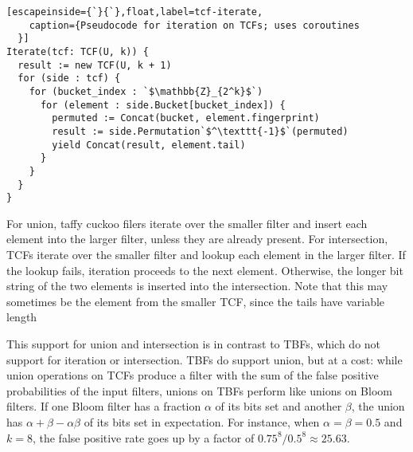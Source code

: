\documentclass[sigconf]{acmart}
\begin{document}


\begin{lstlisting}[escapeinside={`}{`},float,label=tcf-iterate,
    caption={Pseudocode for iteration on TCFs; uses coroutines
  }]
Iterate(tcf: TCF(U, k)) {
  result := new TCF(U, k + 1)
  for (side : tcf) {
    for (bucket_index : `$\mathbb{Z}_{2^k}$`)
      for (element : side.Bucket[bucket_index]) {
        permuted := Concat(bucket, element.fingerprint)
        result := side.Permutation`$^\texttt{-1}$`(permuted)
        yield Concat(result, element.tail)
      }
    }
  }
}
\end{lstlisting}

For union, taffy cuckoo filers iterate over the smaller filter and insert each element into the larger filter, unless they are already present.
For intersection, TCFs iterate over the smaller filter and lookup each element in the larger filter.
If the lookup fails, iteration proceeds to the next element.
Otherwise, the longer bit string of the two elements is inserted into the intersection.
Note that this may sometimes be the element from the smaller TCF, since the tails have variable length


This support for union and intersection is in contrast to TBFs, which do not support for iteration or intersection.
TBFs do support union, but at a cost: while union operations on TCFs produce a filter with the sum of the false positive probabilities of the input filters, unions on TBFs perform like unions on Bloom filters.
If one Bloom filter has a fraction $\alpha$ of its bits set and another $\beta$, the union has $\alpha + \beta - \alpha \beta$ of its bits set in expectation.
For instance, when $\alpha = \beta = 0.5$ and $k = 8$, the false positive rate goes up by a factor of $0.75^8/0.5^8 \approx 25.63$. %
\end{document}
